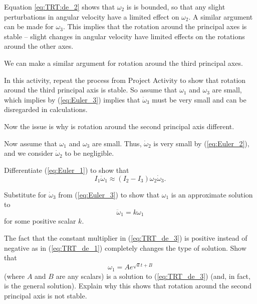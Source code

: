 Equation \ref{eq:TRT:de_2} shows that $\omega_2$ is is bounded, so that any slight perturbations in angular velocity have a limited effect on $\omega_2$. A similar argument can be made for $\omega_3$. This implies that the rotation around the principal axes is stable -- slight changes in angular velocity have limited effects on the rotations around the other axes. 

We can make a similar argument for rotation around the third principal axes.

\begin{pactivity} \label{act:TRT_axes3} In this activity, repeat the process from Project Activity \label{act:TRT_axes1} to show that rotation around the third principal axis is stable. So  assume that $\omega_1$ and $\omega_3$ are small, which implies by (\ref{eq:Euler_3}) implies that $\dot{\omega}_3$ must be very small and can be disregarded in calculations. 

\end{pactivity}

Now the issue is why is rotation around the second principal axis different. 

\begin{pactivity} \label{act:TRT_axes2} Now assume that  $\omega_1$ and $\omega_3$ are small. Thus, $\dot{\omega}_2$ is very small by (\ref{eq:Euler_2}), and we consider $\dot{\omega}_2$ to be negligible. 
\ba
\item Differentiate  (\ref{eq:Euler_1}) to show that 
\[I_1 \ddot{\omega}_1 \approx (I_2-I_3)  \omega_2 \dot{\omega}_3.\]


\item Substitute for $\dot{\omega}_3$ from (\ref{eq:Euler_3}) to show that $\omega_1$ is an approximate solution to 
\begin{equation} \label{eq:TRT_de_3}
\ddot{\omega}_1 = k \omega_1
\end{equation}
for some positive scalar $k$. 

\item The fact that  the constant multiplier in (\ref{eq:TRT_de_3}) is positive instead of negative as in (\ref{eq:TRT_de_1}) completely changes the type of solution. Show that 
\begin{equation} \label{eq:TRT_de_4} 
\omega_1 = Ae^{\sqrt{k}t+B}
\end{equation}
(where $A$ and $B$ are any scalars) is a solution to (\ref{eq:TRT_de_3}) (and, in fact, is the general solution). Explain why this shows that rotation around the second principal axis is not stable. 


\ea

\end{pactivity}



